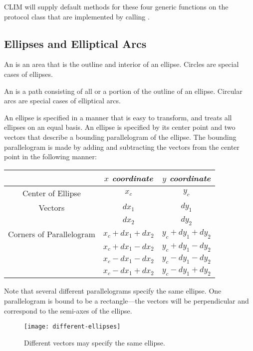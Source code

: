 CLIM will supply default methods for these four generic functions on the
protocol class  that are implemented by calling
.


\subsection {Ellipses and Elliptical Arcs}

An  is an area that is the outline and interior of an ellipse.
Circles are special cases of ellipses.

An  is a path consisting of all or a portion of the
outline of an ellipse.  Circular arcs are special cases of elliptical arcs.

An ellipse is specified in a manner that is easy to transform, and treats all
ellipses on an equal basis.  An ellipse is specified by its center point and two
vectors that describe a bounding parallelogram of the ellipse.  The bounding
parallelogram is made by adding and subtracting the vectors from the center
point in the following manner:

\begin{tabular}{|c|cc|}
 \hline
   & {\sl $x$ coordinate} & {\sl $y$ coordinate} \\
 \hline
 Center of Ellipse & $x_c$ & $y_c$ \\
 \hline
 Vectors & $dx_1$ & $dy_1$ \\
         & $dx_2$ & $dy_2$ \\
 \hline
 Corners of Parallelogram & $x_c + dx_1 + dx_2$ & $y_c + dy_1 + dy_2$ \\
                          & $x_c + dx_1 - dx_2$ & $y_c + dy_1 - dy_2$ \\
                          & $x_c - dx_1 - dx_2$ & $y_c - dy_1 - dy_2$ \\
                          & $x_c - dx_1 + dx_2$ & $y_c - dy_1 + dy_2$ \\
 \hline
\end{tabular}

Note that several different parallelograms specify the same ellipse.  One
parallelogram is bound to be a rectangle---the vectors will be perpendicular
and correspond to the semi-axes of the ellipse.

\begin{figure}
\centerline{\texttt{[image: different-ellipses]}}
\caption{Different vectors may specify the same ellipse.}
\end{figure}

